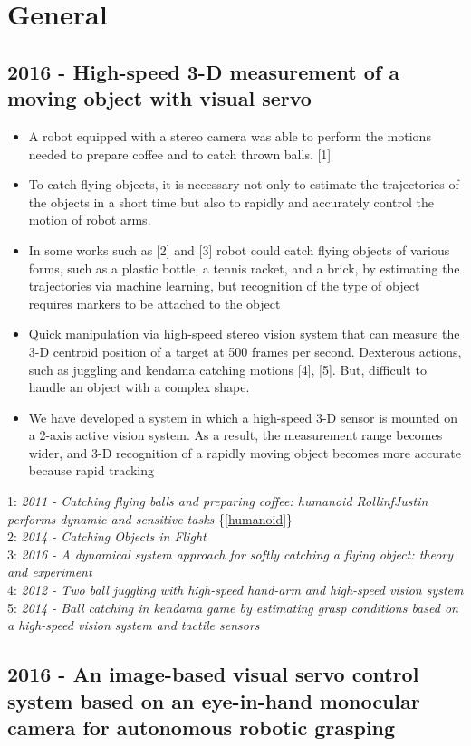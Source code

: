 \section{General}
\subsection{2016 - High-speed 3-D measurement of a moving object with visual servo}
\begin{itemize}
\item A robot equipped with a stereo camera was able to perform the motions needed to prepare coffee and to catch thrown balls. [1]
\item To catch flying objects, it is necessary not only to estimate the trajectories of the objects in a short time but also to rapidly and accurately control the motion of robot arms.
\item In some works such as [2] and [3] robot could catch flying objects of various forms, such as a plastic bottle, a tennis racket, and a brick, by estimating the trajectories via machine learning, but recognition of the type of object requires markers to be attached to the object
\item Quick manipulation via high-speed stereo vision system that can measure the 3-D centroid position of a target at 500 frames per second. Dexterous actions, such as juggling and kendama catching motions [4], [5]. But, difficult to handle an object with a complex shape.
\item  We have developed a system in which a high-speed 3-D sensor is mounted on a 2-axis active vision system. As a result, the measurement range becomes wider, and 3-D recognition of a
rapidly moving object becomes more accurate because rapid
tracking
\end{itemize}
1: \textit{2011 -  Catching flying balls and preparing coffee: humanoid RollinfJustin performs dynamic and sensitive tasks} \{\ref{humanoid}\} \\
2: \textit{2014 -  Catching Objects in Flight} \\
3: \textit{2016 - A dynamical system
approach for softly catching a flying object: theory and experiment} \\
4: \textit{2012 - Two ball
juggling with high-speed hand-arm and high-speed vision system} \\
5: \textit{2014 - Ball catching in kendama game by estimating
grasp conditions based on a high-speed vision system and tactile
sensors}

\subsection{2016 - An image-based visual servo control system based on an eye-in-hand monocular camera for autonomous robotic grasping}

